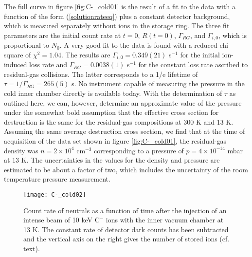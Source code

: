 \documentclass[aps,pra,preprint,superscriptaddress]{revtex4}
\begin{document}
The full curve in figure \ref{fig:C-_cold01} is the result of a fit to the data with a function of the form (\ref{solutionrateeq}) plus a constant detector background, which is measured separately without ions in the storage ring.
The three fit parameters are the initial count rate at $t=0$, $R(t=0)$, $\Gamma_{RG}$, and $\Gamma_{i,0}$, which is proportional to $N_0$.
A very good fit to the data is found with a reduced chi-square of $\chi^2=1.04$. The results are $\Gamma_{i,0}=0.349(21)$ s$^{-1}$ for the initial ion-induced loss rate and $\Gamma_{RG}=0.0038(1)$ s$^{-1}$ for the constant loss rate ascribed to residual-gas collisions. The latter corresponds to a 1/e lifetime of $\tau=1/\Gamma_{RG}=265(5)$ s. No instrument capable of measuring the pressure in the cold inner chamber directly is available today.
With the determination of $\tau$ as outlined here, we can, however, determine an approximate value of the pressure under the somewhat bold assumption that the effective cross section for destruction is the same for the residual-gas compositions at 300 K and 13 K.
Assuming the same average destruction cross section, we
find that at the time of acquisition of the data set shown in figure \ref{fig:C-_cold01}, the residual-gas density was
$n=2 \times 10^4$ cm$^{-3}$
corresponding to a pressure of
$p=4 \times 10^{-14}$
mbar at 13 K.
The uncertainties in the values for the density and pressure are estimated to be about a factor of two, which includes the uncertainty of the room temperature pressure measurement.

\begin{figure}
	\centering
		\texttt{[image: C-\_cold02]}
	\caption{Count rate of neutrals as a function of time after the injection of an intense beam of 10 keV C$^-$ ions with the inner vacuum chamber at 13 K. The constant rate of detector dark counts has been subtracted and the vertical axis on the right gives the number of stored ions (cf. text).}
	\label{fig:C-_cold02}
\end{figure}
\end{document}
